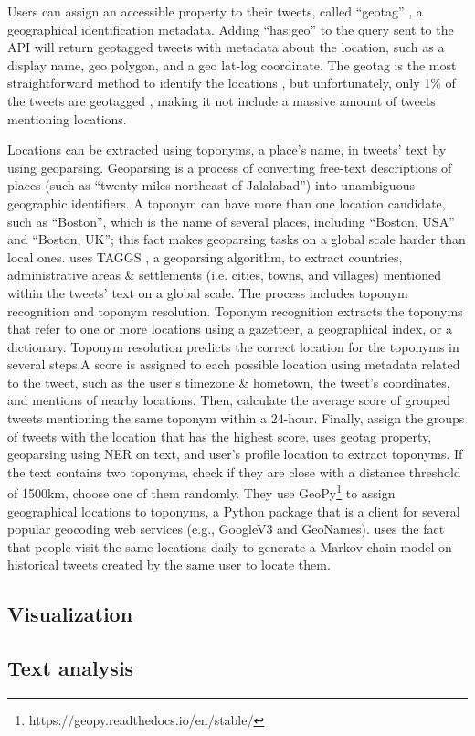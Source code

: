 Users can assign an accessible property to their tweets, called ``geotag'' , a geographical
identification metadata. Adding ``has:geo'' to the query sent to the API will return geotagged
tweets with metadata about the location, such as a display name, geo polygon, and a geo lat-log
coordinate. The geotag is the most straightforward method to identify the locations 
\cite{fengExtractionPluvialFlood2018}, but unfortunately, only 1\% of the tweets are geotagged
\cite{middletonLocationExtractionSocial2018}, making it not include a massive amount of tweets
mentioning locations.

Locations can be extracted using toponyms, a place's name, in tweets' text by using geoparsing.
Geoparsing is a process of converting free-text descriptions of places
(such as ``twenty miles northeast of Jalalabad'') into unambiguous geographic identifiers. A toponym
can have more than one location candidate, such as ``Boston'', which is the name of several places,
including ``Boston, USA'' and ``Boston, UK''; this fact makes geoparsing tasks on a global scale
harder than local ones.  uses TAGGS
, a geoparsing algorithm, to extract countries,
administrative areas \& settlements (i.e. cities, towns, and villages) mentioned within the tweets'
text on a global scale. The process includes toponym recognition and toponym resolution.  Toponym
recognition extracts the toponyms that refer to one or more locations using a gazetteer, a
geographical index, or a dictionary. Toponym resolution predicts the correct location for the
toponyms in several steps.A score is assigned to each possible location using metadata related to
the tweet, such as the user's timezone \& hometown, the tweet's coordinates, and mentions of nearby
locations. Then, calculate the average score of grouped tweets mentioning the same toponym within a
24-hour. Finally, assign the groups of tweets with the location that has the highest score.
 uses geotag property, geoparsing using
\ac{NER} on text, and user's profile location to extract toponyms. If the text contains two
toponyms, check if they are close with a distance threshold of 1500km, choose one of them randomly.
They use GeoPy\footnote{https://geopy.readthedocs.io/en/stable/} to assign geographical locations to
toponyms, a Python package that is a client for several popular geocoding web services (e.g.,
GoogleV3 and GeoNames).  uses the fact that people
visit the same locations daily to generate a Markov chain model on historical tweets created by the
same user to locate them.
\subsection{Visualization}

\subsection{Text analysis}
